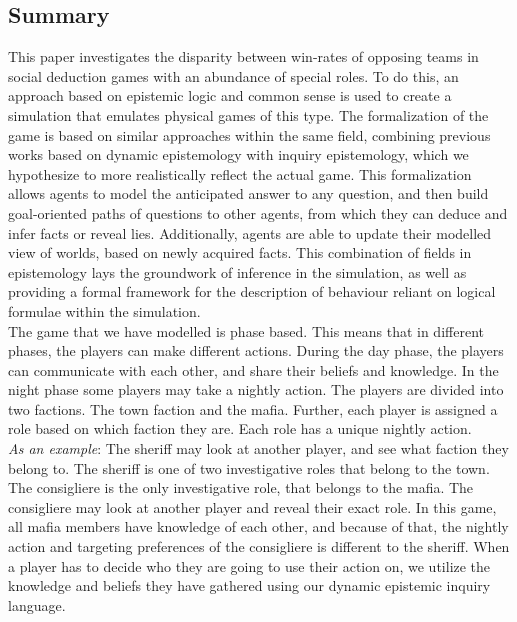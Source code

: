 \onecolumn
\begin{center}
	\section*{Summary}\label{sec:summary}
\end{center}
This paper investigates the disparity between win-rates of opposing teams in
social deduction games with an abundance of special roles. To do  this, an
approach based on epistemic logic and common sense is used to create a
simulation that emulates physical games of this type. The formalization of the
game is based on similar approaches within the same field, combining previous works based on dynamic epistemology with inquiry epistemology,
which we hypothesize to more realistically reflect the actual game. This formalization allows agents to model the anticipated answer to any question, and then build goal-oriented
paths of questions to other agents, from which they can deduce and infer facts or reveal lies. Additionally, agents are able to update their modelled view of worlds, based on newly acquired facts.
This combination of fields in epistemology lays the groundwork of inference in the simulation,
as well as providing a formal framework for the description of behaviour
reliant on logical formulae within the simulation. \\
The game that we have modelled is phase based. This means that in different phases, the players can make different actions. During the day phase, the players can communicate with each other, and share their beliefs and knowledge. In the night phase some players may take a nightly action. The players are divided into two factions. The town faction and the mafia. Further, each player is assigned a role based on which faction they are. Each role has a unique nightly action.\\ \textit{As an example}: The sheriff may look at another player, and see what faction they belong to. The sheriff is one of two investigative roles that belong to the town. The consigliere is the only investigative role, that belongs to the mafia. The consigliere may look at another player and reveal their exact role. In this game, all mafia members have knowledge of each other, and because of that, the nightly action and targeting preferences of the consigliere is different to the sheriff.
When a player has to decide who they are going to use their action on, we utilize the knowledge and beliefs they have gathered using our dynamic epistemic inquiry language. \\
